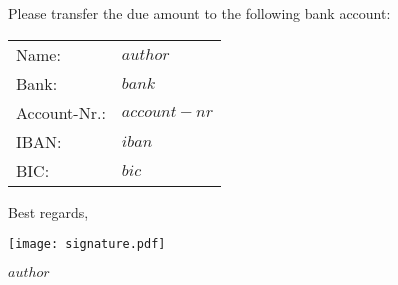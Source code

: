 \documentclass[$fontsize$, a4paper]{article}
\renewcommand{\arraystretch}{1.5} %
\begin{document}
\vspace{3em}

\sffamily
\small
Please transfer the due amount to the following bank account:

\vspace{3mm}
\renewcommand{\arraystretch}{1} 
\begin{tabular}{ll}
  Name: & $author$\\
  Bank: & $bank$\\
  Account-Nr.: & $account-nr$\\
  IBAN: & $iban$\\
  BIC: & $bic$
\end{tabular}

\vspace{6em}
Best regards,\\
\medskip

{
      \texttt{[image: signature.pdf]} \par
}

$author$
\end{document}
